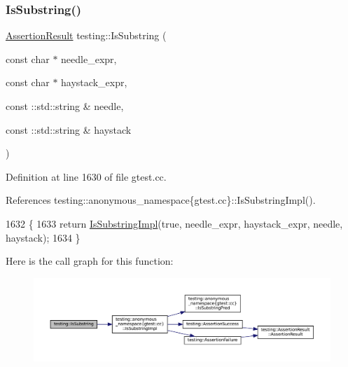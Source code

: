 \subsubsection{\texorpdfstring{Is\+Substring()}{IsSubstring()}\hspace{0.1cm}{\footnotesize\ttfamily [3/3]}}
{\footnotesize\ttfamily \hyperlink{classtesting_1_1AssertionResult}{Assertion\+Result} testing\+::\+Is\+Substring (\begin{DoxyParamCaption}\item[{const char $\ast$}]{needle\+\_\+expr,  }\item[{const char $\ast$}]{haystack\+\_\+expr,  }\item[{const \+::std\+::string \&}]{needle,  }\item[{const \+::std\+::string \&}]{haystack }\end{DoxyParamCaption})}



Definition at line 1630 of file gtest.\+cc.



References testing\+::anonymous\+\_\+namespace\{gtest.\+cc\}\+::\+Is\+Substring\+Impl().


\begin{DoxyCode}
1632                                                         \{
1633   \textcolor{keywordflow}{return} \hyperlink{namespacetesting_1_1anonymous__namespace_02gtest_8cc_03_a0e1cb1e2b03a87a9c893322e4caab670}{IsSubstringImpl}(\textcolor{keyword}{true}, needle\_expr, haystack\_expr, needle, haystack);
1634 \}
\end{DoxyCode}
Here is the call graph for this function\+:
\nopagebreak
\begin{figure}[H]
\begin{center}
\leavevmode
\includegraphics[width=350pt]{namespacetesting_a571c7edcfc574269833ebe3e7d338ec5_cgraph}
\end{center}
\end{figure}
\mbox{\label{namespacetesting_a6212e76b542f4ffd3079de59092a826a}} 
